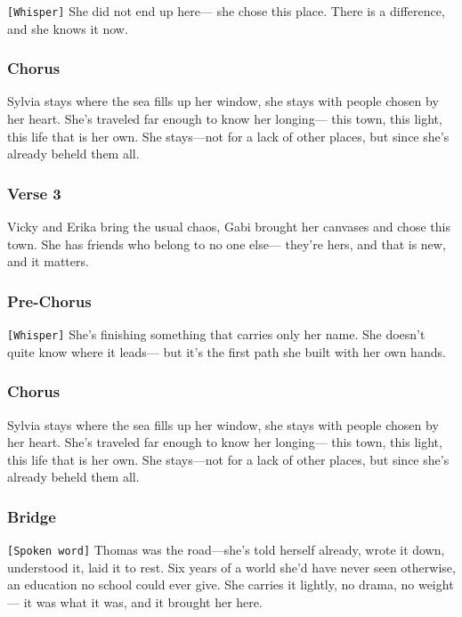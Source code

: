 \texttt{{[}Whisper{]}} She did not end up here--- she chose this place.
There is a difference, and she knows it now.

\subsubsection{Chorus}\label{chorus-49}

Sylvia stays where the sea fills up her window, she stays with people
chosen by her heart. She's traveled far enough to know her longing---
this town, this light, this life that is her own. She stays---not for a
lack of other places, but since she's already beheld them all.

\subsubsection{Verse 3}\label{verse-3-11}

Vicky and Erika bring the usual chaos, Gabi brought her canvases and
chose this town. She has friends who belong to no one else--- they're
hers, and that is new, and it matters.

\subsubsection{Pre-Chorus}\label{pre-chorus-35}

\texttt{{[}Whisper{]}} She's finishing something that carries only her
name. She doesn't quite know where it leads--- but it's the first path
she built with her own hands.

\subsubsection{Chorus}\label{chorus-50}

Sylvia stays where the sea fills up her window, she stays with people
chosen by her heart. She's traveled far enough to know her longing---
this town, this light, this life that is her own. She stays---not for a
lack of other places, but since she's already beheld them all.

\subsubsection{Bridge}\label{bridge-15}

\texttt{{[}Spoken\ word{]}} Thomas was the road---she's told herself
already, wrote it down, understood it, laid it to rest. Six years of a
world she'd have never seen otherwise, an education no school could ever
give. She carries it lightly, no drama, no weight--- it was what it was,
and it brought her here.

